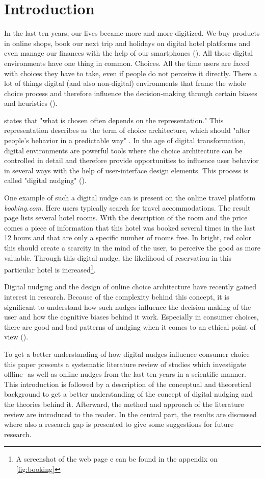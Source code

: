 \section{Introduction}
In the last ten years, our lives became more and more digitized. We buy products in online shops, book our next trip and holidays on digital hotel platforms and even manage our finances with the help of our smartphones (\cite{schneider_digital_2018}). All those digital environments have one thing in common. Choices. All the time users are faced with choices they have to take,  even if people do not perceive it directly. There a lot of things digital (and also non-digital) environments that frame the whole choice process and therefore influence the decision-making through certain biases and heuristics (\cite{tversky_judgment_1974}). 

\cite{johnson_beyond_2012} states that "what is chosen often depends on the representation." This representation describes as the term of choice architecture, which should "alter people's behavior in a predictable way" \cite{thaler_nudge:_2009}. In the age of digital transformation, digital environments are powerful tools where the choice architecture can be controlled in detail and therefore provide opportunities to influence user behavior in several ways with the help of user-interface design elements. This process is called "digital nudging" (\cite{weinmann_digital_2016}).

One example of such a digital nudge can is present on the online travel platform \textit{booking.com}. Here users typically search for travel accommodations. The result page lists several hotel rooms. With the description of the room and the price comes a piece of information that this hotel was booked several times in the last 12 hours and that are only a specific number of rooms free. In bright, red color this should create a scarcity in the mind of the user, to perceive the good as more valuable. Through this digital nudge, the likelihood of reservation in this particular hotel is increased\footnote{A screenshot of the web page e can be found in the appendix on \ref{fig:booking}}.

Digital nudging and the design of online choice architecture have recently gained interest in research. Because of the complexity behind this concept, it is significant to understand how such nudges influence the decision-making of the user and how the cognitive biases behind it work. Especially in consumer choices, there are good and bad patterns of nudging when it comes to an ethical point of view (\cite{sunstein_nudging_2015}).

To get a better understanding of how digital nudges influence consumer choice this paper presents a systematic literature review of studies which investigate offline- as well as online nudges from the last ten years in a scientific manner. This introduction is followed by a description of the conceptual and theoretical background to get a better understanding of the concept of digital nudging and the theories behind it. Afterward, the method and approach of the literature review are introduced to the reader. In the central part, the results are discussed where also a research gap is presented to give some suggestions for future research.
